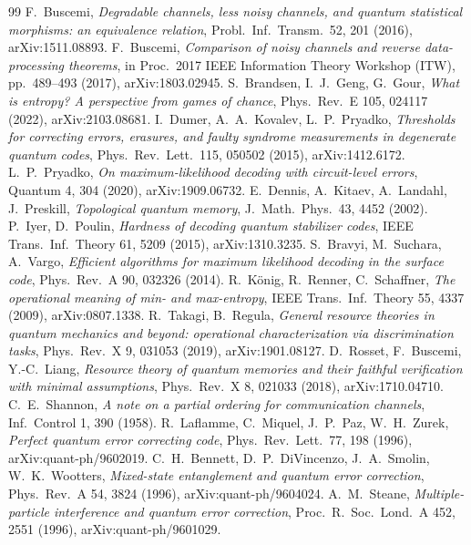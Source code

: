 \begin{thebibliography}{99}
 F.~Buscemi, \emph{Degradable channels, less noisy channels, and quantum statistical morphisms: an equivalence relation}, Probl.\ Inf.\ Transm.\ 52, 201 (2016), arXiv:1511.08893. %
 F.~Buscemi, \emph{Comparison of noisy channels and reverse data-processing theorems}, in Proc.\ 2017 IEEE Information Theory Workshop (ITW), pp.~489--493 (2017), arXiv:1803.02945. %
 S.~Brandsen, I.~J.~Geng, G.~Gour, \emph{What is entropy? A perspective from games of chance}, Phys.\ Rev.\ E 105, 024117 (2022), arXiv:2103.08681. %
 I.~Dumer, A.~A.~Kovalev, L.~P.~Pryadko, \emph{Thresholds for correcting errors, erasures, and faulty syndrome measurements in degenerate quantum codes}, Phys.\ Rev.\ Lett.\ 115, 050502 (2015), arXiv:1412.6172. %
 L.~P.~Pryadko, \emph{On maximum-likelihood decoding with circuit-level errors}, Quantum 4, 304 (2020), arXiv:1909.06732. %
 E.~Dennis, A.~Kitaev, A.~Landahl, J.~Preskill, \emph{Topological quantum memory}, J.\ Math.\ Phys.\ 43, 4452 (2002). %
 P.~Iyer, D.~Poulin, \emph{Hardness of decoding quantum stabilizer codes}, IEEE Trans.\ Inf.\ Theory 61, 5209 (2015), arXiv:1310.3235. %
 S.~Bravyi, M.~Suchara, A.~Vargo, \emph{Efficient algorithms for maximum likelihood decoding in the surface code}, Phys.\ Rev.\ A 90, 032326 (2014). %
 R.~K\"onig, R.~Renner, C.~Schaffner, \emph{The operational meaning of min- and max-entropy}, IEEE Trans.\ Inf.\ Theory 55, 4337 (2009), arXiv:0807.1338. %
 R.~Takagi, B.~Regula, \emph{General resource theories in quantum mechanics and beyond: operational characterization via discrimination tasks}, Phys.\ Rev.\ X 9, 031053 (2019), arXiv:1901.08127. %
 D.~Rosset, F.~Buscemi, Y.-C.~Liang, \emph{Resource theory of quantum memories and their faithful verification with minimal assumptions}, Phys.\ Rev.\ X 8, 021033 (2018), arXiv:1710.04710. %
 C.~E.~Shannon, \emph{A note on a partial ordering for communication channels}, Inf.\ Control 1, 390 (1958). %
 R.~Laflamme, C.~Miquel, J.~P.~Paz, W.~H.~Zurek, \emph{Perfect quantum error correcting code}, Phys.\ Rev.\ Lett.\ 77, 198 (1996), arXiv:quant-ph/9602019. %
 C.~H.~Bennett, D.~P.~DiVincenzo, J.~A.~Smolin, W.~K.~Wootters, \emph{Mixed-state entanglement and quantum error correction}, Phys.\ Rev.\ A 54, 3824 (1996), arXiv:quant-ph/9604024. %
 A.~M.~Steane, \emph{Multiple-particle interference and quantum error correction}, Proc.\ R.\ Soc.\ Lond.\ A 452, 2551 (1996), arXiv:quant-ph/9601029. %

\end{thebibliography}
